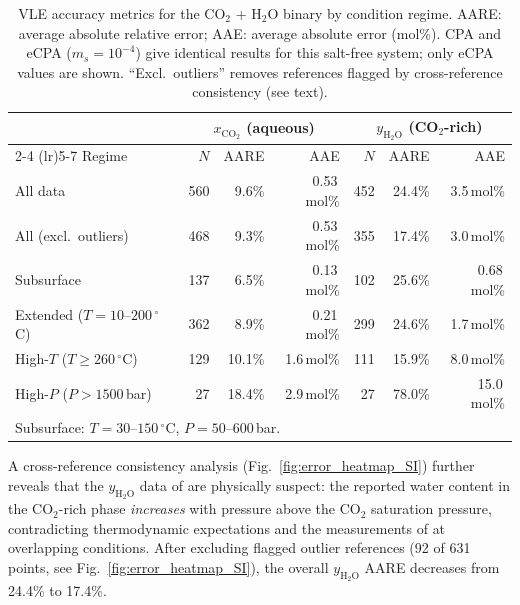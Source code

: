 \documentclass[preprint,12pt,authoryear]{elsarticle}
\begin{document}
\begin{table}[H]
  \centering
  \caption{VLE accuracy metrics for the CO$_2$ + H$_2$O binary by condition regime.
           AARE: average absolute relative error; AAE: average absolute error (mol\%).
           CPA and eCPA ($m_s = 10^{-4}$) give identical results for this salt-free system;
           only eCPA values are shown.
           ``Excl.\ outliers'' removes references flagged by cross-reference consistency
           (see text).}
  \label{tab:co2h2o_metrics}
  \begin{tabular}{lrrrrrr}
    \toprule
    & \multicolumn{3}{c}{$x_{\text{CO}_2}$ (aqueous)} & \multicolumn{3}{c}{$y_{\text{H}_2\text{O}}$ (CO$_2$-rich)} \\
    \cmidrule(lr){2-4} \cmidrule(lr){5-7}
    Regime & $N$ & AARE & AAE & $N$ & AARE & AAE \\
    \midrule
    All data                          & 560 & 9.6\% & 0.53\,mol\% & 452 & 24.4\% & 3.5\,mol\% \\
    All (excl.\ outliers)             & 468 & 9.3\% & 0.53\,mol\% & 355 & 17.4\% & 3.0\,mol\% \\
    Subsurface                        & 137 & 6.5\% & 0.13\,mol\% & 102 & 25.6\% & 0.68\,mol\% \\
    Extended ($T = 10$--$200\,^\circ$C)    & 362 & 8.9\% & 0.21\,mol\% & 299 & 24.6\% & 1.7\,mol\% \\
    High-$T$ ($T \geq 260\,^\circ$C)        & 129 & 10.1\% & 1.6\,mol\% & 111 & 15.9\% & 8.0\,mol\% \\
    High-$P$ ($P > 1500$\,bar)        & 27  & 18.4\% & 2.9\,mol\% & 27  & 78.0\% & 15.0\,mol\% \\
    \bottomrule
    \multicolumn{7}{l}{\footnotesize Subsurface: $T = 30$--$150\,^\circ$C, $P = 50$--$600$\,bar.} \\
  \end{tabular}
\end{table}

A cross-reference consistency analysis (Fig.~\ref{fig:error_heatmap_SI}) further reveals
that the $y_{\text{H}_2\text{O}}$ data of \citet{King1992} are physically suspect:
the reported water content in the CO$_2$-rich phase \emph{increases} with pressure above
the CO$_2$ saturation pressure, contradicting thermodynamic expectations and the measurements
of \citet{Meyer2015} at overlapping conditions.
After excluding flagged outlier references (92 of 631 points, see
Fig.~\ref{fig:error_heatmap_SI}), the overall $y_{\text{H}_2\text{O}}$ AARE decreases from
24.4\% to 17.4\%.
\end{document}
